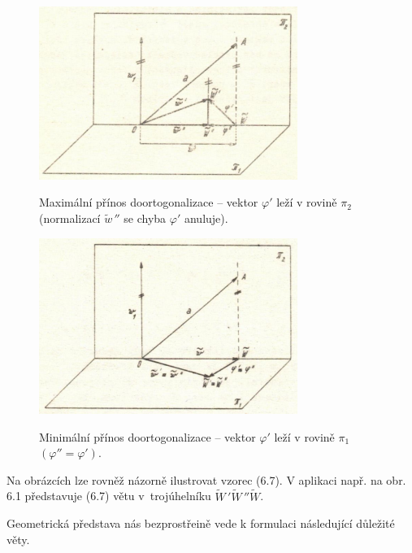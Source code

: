 \begin{figure}\centering
\includegraphics[width=0.75\textwidth]{obr_6.2.png}
%
\label{6.2.}
\caption{Maximální přínos doortogonalizace -- vektor $\varphi'$ leží
  v rovině $\pi_2$ (normalizací $\widetilde w\,''$ se chyba
  $\varphi'$ anuluje).}
%
\end{figure}

\begin{figure}\centering
\includegraphics[width=0.75\textwidth]{obr_6.3.png}
%
\label{6.3.}
\caption{Minimální přínos doortogonalizace -- vektor $\varphi'$ leží
v rovině $\pi_1$ $(\varphi'' = \varphi')$.}
%
\end{figure}

\noindent
Na obrázcích  lze rovněž názorně ilustrovat vzorec (6.7). V
aplikaci např. na obr. 6.1 představuje (6.7) 
větu v~trojúhelníku $\widetilde W\,' \widetilde W\,'' \widetilde W $.

Geometrická představa nás bezprostřeině vede k formulaci následující
důležité věty.



